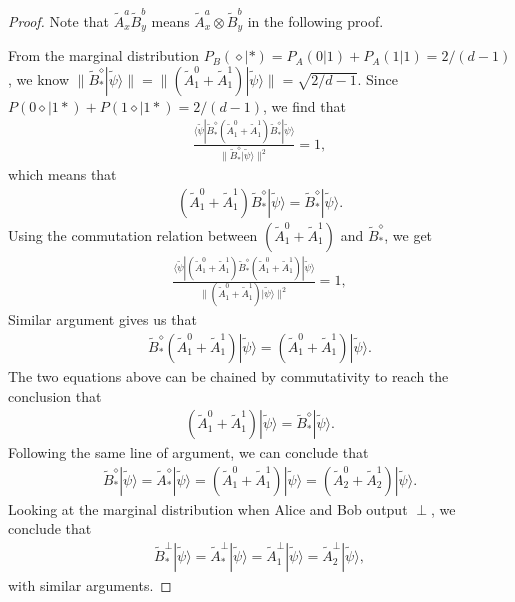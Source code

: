 \documentclass[11pt,letterpaper]{article}
\newcommand{\ket}[1]{|#1\rangle}
\newcommand{\bra}[1]{\langle#1|}
\newcommand{\x}{\otimes}
\newcommand{\1}{\mathbb{1}}
\newcommand{\tA}{\tilde{A}}
\newcommand{\tB}{\tilde{B}}
\newcommand{\tpsi}{\tilde{\psi}}
\newcommand{\pr}[2]{P(#1|#2)}
\newcommand{\pa}[2]{P_A(#1|#2)}
\newcommand{\pb}[2]{P_B(#1|#2)}
\theoremstyle{definition}
\begin{document}
\begin{proof}
Note that $\tA_x^a \tB_y^b$ means $\tA_x^a \x\tB_y^b$ in the following proof.

From the marginal distribution $\pb{\diamond}{\ast} = \pa{0}{1}+\pa{1}{1} = 2/(d-1)$,
we know $\| \tB_\ast^\diamond \ket{\tpsi} \| = \| (\tA_1^0+\tA_1^1) \ket{\tpsi}\| = \sqrt{2/d-1}$.
Since $\pr{0\diamond}{1\ast} + \pr{1\diamond}{1\ast} = 2/(d-1)$, we find that 
\begin{align*}
	\frac{\bra{\tpsi}\tB_\ast^\diamond (\tA_1^0+\tA_1^1) \tB_\ast^\diamond\ket{\tpsi}}{ \| \tB_\ast^\diamond \ket{\tpsi} \|^2} = 1,
\end{align*}
which means that 
\begin{align}
	(\tA_1^0+\tA_1^1)\tB_\ast^\diamond \ket{\tpsi} = \tB_\ast^\diamond \ket{\tpsi}.
\end{align}
Using the commutation relation between $(\tA_1^0+\tA_1^1)$ and $\tB_\ast^\diamond$, we get
\begin{align*}
	\frac{\bra{\tpsi} (\tA_1^0+\tA_1^1) \tB_\ast^\diamond(\tA_1^0+\tA_1^1)\ket{\tpsi}}{ \| (\tA_1^0+\tA_1^1) \ket{\tpsi} \|^2} = 1,
\end{align*}
Similar argument gives us that 
\begin{align}
	\tB_\ast^\diamond (\tA_1^0+\tA_1^1) \ket{\tpsi} = (\tA_1^0+\tA_1^1)\ket{\tpsi}.
\end{align}
The two equations above can be chained by commutativity to reach the conclusion that 
\begin{align}
	(\tA_1^0+\tA_1^1)\ket{\tpsi} = \tB_\ast^\diamond \ket{\tpsi}.
\end{align}
Following the same line of argument, we can conclude that
\begin{align}
	\tB_\ast^\diamond \ket{\tpsi} = \tA_\ast^\diamond \ket{\tpsi} = (\tA_1^0+\tA_1^1)\ket{\tpsi} = (\tA_2^0+\tA_2^1)\ket{\tpsi}.
\end{align}
Looking at the marginal distribution when Alice and Bob output $\perp$, we conclude that 
\begin{align}
	\tB_\ast^\perp \ket{\tpsi} = \tA_\ast^\perp \ket{\tpsi} = \tA_1^\perp \ket{\tpsi} = \tA_2^\perp \ket{\tpsi},
\end{align}
with similar arguments.


\end{proof}
\end{document}

